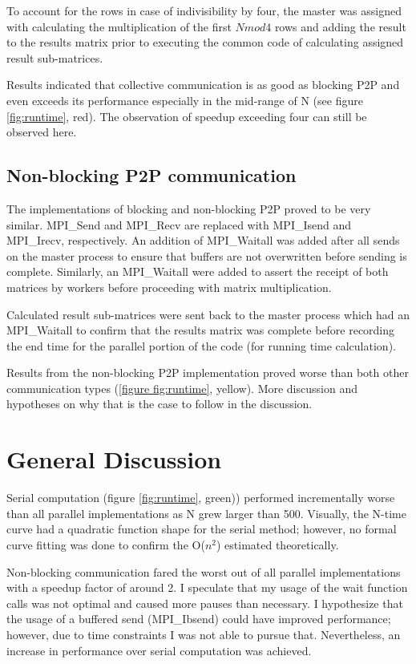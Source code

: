 \documentclass[12pt]{report}
\begin{document}
To account for the rows in case of indivisibility by four, the master was assigned with calculating the multiplication of the first $Nmod4$ rows and adding the result to the results matrix prior to executing the common code of calculating assigned result sub-matrices. 

Results indicated that collective communication is as good as blocking P2P and even exceeds its performance especially in the mid-range of N (see figure \ref{fig:runtime}, red). The observation of speedup exceeding four can still be observed here. 

\section{Non-blocking P2P communication}
The implementations of blocking and non-blocking P2P proved to be very similar. MPI\_Send and MPI\_Recv are replaced with MPI\_Isend and MPI\_Irecv, respectively. An addition of MPI\_Waitall was added after all sends on the master process to ensure that buffers are not overwritten before sending is complete. Similarly, an MPI\_Waitall were added to assert the receipt of both matrices by workers before proceeding with matrix multiplication.

Calculated result sub-matrices were sent back to the master process which had an MPI\_Waitall to confirm that the results matrix was complete before recording the end time for the parallel portion of the code (for running time calculation).

Results from the non-blocking P2P implementation proved worse than both other communication types (\ref{figure fig:runtime}, yellow). More discussion and hypotheses on why that is the case to follow in the discussion.


\chapter{General Discussion}
Serial computation (figure \ref{fig:runtime}, green)) performed incrementally worse than all parallel implementations as N grew larger than 500. Visually, the N-time curve had a quadratic function shape for the serial method; however, no formal curve fitting was done to confirm the O($n^2$) estimated theoretically.

Non-blocking communication fared the worst out of all parallel implementations with a speedup factor of around 2. I speculate that my usage of the wait function calls was not optimal and caused more pauses than necessary. I hypothesize that the usage of a buffered send (MPI\_Ibsend) could have improved performance; however, due to time constraints I was not able to pursue that. Nevertheless, an increase in performance over serial computation was achieved.
\end{document}

